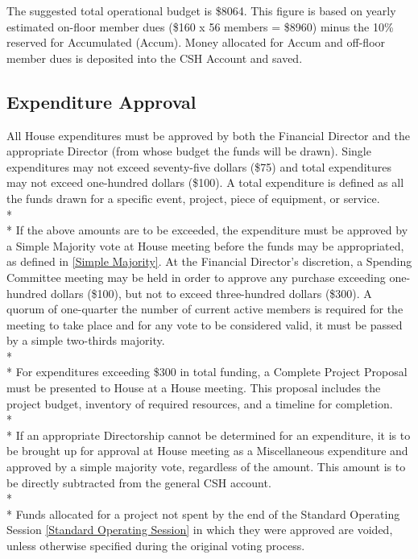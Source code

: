 \documentclass{article}
\newcommand{\bsection}[1]{\subsection{#1} \label{#1}}
\begin{document}
The suggested total operational budget is \$8064.
This figure is based on yearly estimated on-floor member dues (\$160 x 56 members = \$8960) minus the 10\% reserved for Accumulated (Accum).
Money allocated for Accum and off-floor member dues is deposited into the CSH Account and saved.

\bsection{Expenditure Approval}
All House expenditures must be approved by both the Financial Director and the appropriate Director (from whose budget the funds will be drawn).
Single expenditures may not exceed seventy-five dollars (\$75) and total expenditures may not exceed one-hundred dollars (\$100).
A total expenditure is defined as all the funds drawn for a specific event, project, piece of equipment, or service.
\\* \\*
If the above amounts are to be exceeded, the expenditure must be approved by a Simple Majority vote at House meeting before the funds may be appropriated, as defined in \ref{Simple Majority}.
At the Financial Director's discretion, a Spending Committee meeting may be held in order to approve any purchase exceeding one-hundred dollars (\$100), but not to exceed three-hundred dollars (\$300).
A quorum of one-quarter the number of current active members is required for the meeting to take place and for any vote to be considered valid, it must be passed by a simple two-thirds majority.
\\*\\*
For expenditures exceeding \$300 in total funding, a Complete Project Proposal must be presented to House at a House meeting.
This proposal includes the project budget, inventory of required resources, and a timeline for completion.
\\* \\*
If an appropriate Directorship cannot be determined for an expenditure, it is to be brought up for approval at House meeting as a Miscellaneous expenditure and approved by a simple majority vote, regardless of the amount.
This amount is to be directly subtracted from the general CSH account. 
\\* \\*
Funds allocated for a project not spent by the end of the Standard Operating Session \ref{Standard Operating Session} in which they were approved are voided, unless otherwise specified during the original voting process.
\end{document}
